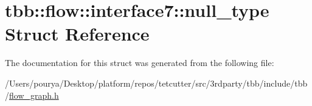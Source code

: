 \hypertarget{structtbb_1_1flow_1_1interface7_1_1null__type}{}\section{tbb\+:\+:flow\+:\+:interface7\+:\+:null\+\_\+type Struct Reference}
\label{structtbb_1_1flow_1_1interface7_1_1null__type}


The documentation for this struct was generated from the following file\+:\begin{DoxyCompactItemize}
\item 
/\+Users/pourya/\+Desktop/platform/repos/tetcutter/src/3rdparty/tbb/include/tbb/\hyperlink{flow__graph_8h}{flow\+\_\+graph.\+h}\end{DoxyCompactItemize}
